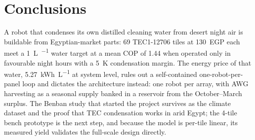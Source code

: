 \documentclass[11pt,a4paper]{article}
\begin{document}
\section{Conclusions}
\label{sec:conclusions}

A robot that condenses its own distilled cleaning water from desert
night air is buildable from Egyptian-market parts: \num{69}
TEC1-12706 tiles at \num{130}~EGP each meet a \SI{1}{\liter\per\dy}
water target at a mean COP of \num{1.44} when operated only in
favourable night hours with a \SI{5}{\kelvin} condensation margin. The
energy price of that water, \SI{5.27}{\kWh\per\liter} at system level,
rules out a self-contained one-robot-per-panel loop and dictates the
architecture instead: one robot per array, with AWG harvesting as a
seasonal supply banked in a reservoir from the October--March surplus.
The Benban study that started the project survives as the climate
dataset and the proof that TEC condensation works in arid Egypt; the
4-tile bench prototype is the next step, and because the model is
per-tile linear, its measured yield validates the full-scale design
directly.



\end{document}
